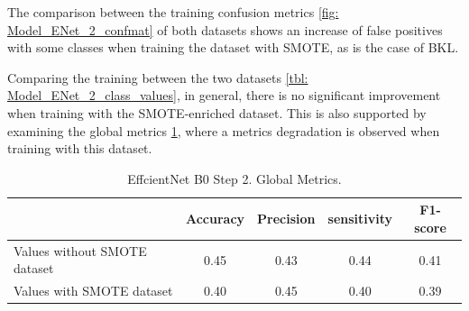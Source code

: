 \hspace{1cm}
\hspace{1cm}
\hspace{1cm}
\hspace{1cm}

The comparison between the training confusion metrics \ref{fig: Model_ENet_2_confmat} of both datasets shows an increase of false positives with some classes when training the dataset with SMOTE, as is the case of BKL. 

\begin{table}[ht]
\centering
{}
    \caption{EffcientNet B0 Step 2. Metrics obtained by class.}
    \label{tbl: Model_ENet_2_class_values}
\end{table}

Comparing the training between the two datasets \ref{tbl: Model_ENet_2_class_values}, in general, there is no significant improvement when training with the SMOTE-enriched dataset. This is also supported by examining the global metrics \ref{tbl: Model_ENet_2_global_values}, where a metrics degradation is observed when training with this dataset.

\begin{table}[ht]
\centering
\begin{tabular}{lcccc}
\cline{2-5}
 & \textbf{Accuracy} & \textbf{Precision} & \textbf{sensitivity} & \textbf{F1-score} \\ \hline
Values without SMOTE dataset & 0.45 & 0.43 & 0.44 & 0.41 \\ \hline
Values with SMOTE dataset & 0.40 & 0.45 & 0.40 & 0.39 \\ \hline
\end{tabular}
    \caption{EffcientNet B0 Step 2. Global Metrics.}
    \label{tbl: Model_ENet_2_global_values}
\end{table}



